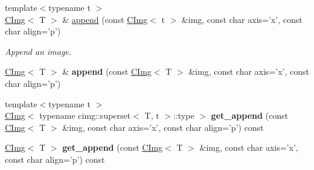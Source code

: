 \begin{DoxyCompactItemize}
\item 
\hypertarget{structcimg__library_1_1CImg_ac575d78effce14592d1a8c2c55c942a3}{
{\footnotesize template$<$typename t $>$ }\\\hyperlink{structcimg__library_1_1CImg}{CImg}$<$ T $>$ \& \hyperlink{structcimg__library_1_1CImg_ac575d78effce14592d1a8c2c55c942a3}{append} (const \hyperlink{structcimg__library_1_1CImg}{CImg}$<$ t $>$ \&img, const char axis='x', const char align='p')}
\label{structcimg__library_1_1CImg_ac575d78effce14592d1a8c2c55c942a3}

\begin{DoxyCompactList}\small\item\em Append an image. \item\end{DoxyCompactList}\item 
\hypertarget{structcimg__library_1_1CImg_aec1b72e754fd181d7ad3c92359f3b767}{
\hyperlink{structcimg__library_1_1CImg}{CImg}$<$ T $>$ \& {\bfseries append} (const \hyperlink{structcimg__library_1_1CImg}{CImg}$<$ T $>$ \&img, const char axis='x', const char align='p')}
\label{structcimg__library_1_1CImg_aec1b72e754fd181d7ad3c92359f3b767}

\item 
\hypertarget{structcimg__library_1_1CImg_a8688a628a9f72e71e097455ba8c52302}{
{\footnotesize template$<$typename t $>$ }\\\hyperlink{structcimg__library_1_1CImg}{CImg}$<$ typename cimg::superset$<$ T, t $>$::type $>$ {\bfseries get\_\-append} (const \hyperlink{structcimg__library_1_1CImg}{CImg}$<$ T $>$ \&img, const char axis='x', const char align='p') const }
\label{structcimg__library_1_1CImg_a8688a628a9f72e71e097455ba8c52302}

\item 
\hypertarget{structcimg__library_1_1CImg_afe3c55bee9e63bbe9e5176f5989725fe}{
\hyperlink{structcimg__library_1_1CImg}{CImg}$<$ T $>$ {\bfseries get\_\-append} (const \hyperlink{structcimg__library_1_1CImg}{CImg}$<$ T $>$ \&img, const char axis='x', const char align='p') const }
\label{structcimg__library_1_1CImg_afe3c55bee9e63bbe9e5176f5989725fe}

\end{DoxyCompactItemize}
